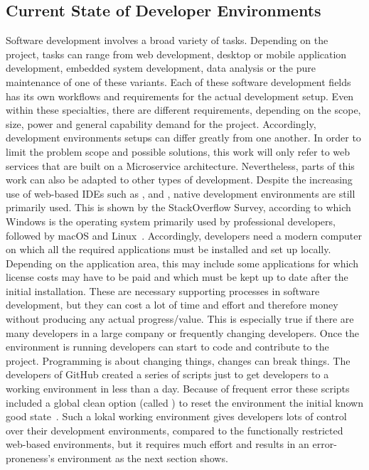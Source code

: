 \documentclass[12pt, a4paper]{article}
\begin{document}
    \subsection{Current State of Developer Environments}
    Software development involves a broad variety of tasks. Depending on the project, tasks can range from web development, desktop or mobile application development, embedded system development, data analysis or the pure maintenance of one of these variants. Each of these software development fields has its own workflows and requirements for the actual development setup. Even within these specialties, there are different requirements, depending on the scope, size, power and general capability demand for the project. Accordingly, development environments setups can differ greatly from one another. In order to limit the problem scope and possible solutions, this work will only refer to web services that are built on a Microservice architecture. Nevertheless, parts of this work can also be adapted to other types of development.\newline
    Despite the increasing use of web-based \ac{IDE}s such as ,   and , native development environments are still primarily used. This is shown by the StackOverflow Survey, according to which Windows is the operating system primarily used by professional developers, followed by macOS and Linux~\cite{stackoverflow2021}. Accordingly, developers need a modern computer on which all the required applications must be installed and set up locally. Depending on the application area, this may include some applications for which license costs may have to be paid and which must be kept up to date after the initial installation. These are necessary supporting processes in software development, but they can cost a lot of time and effort and therefore money without producing any actual progress/value. This is especially true if there are many developers in a large company or frequently changing developers. Once the environment is running developers can start to code and contribute to the project. Programming is about changing things, changes can break things. The developers of GitHub created a series of scripts just to get developers to a working environment in less than a day. Because of frequent error these scripts included a global clean option (called ) to reset the environment the initial known good state~\cite{githubblogcodespace}.\newline
    Such a lokal working environment gives developers lots of control over their development environments, compared to the functionally restricted web-based environments, but it requires much effort and results in an error-proneness's environment as the next section shows.
\end{document}
